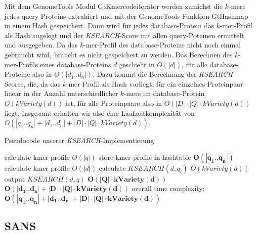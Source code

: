 \documentclass{article}
\begin{document}
Mit dem GenomeTools Modul GtKmercodeiterator werden zunächst die $k$-mere jedes query-Proteins extrahiert und mit der GenomeTools Funktion GtHashmap in einem Hash gespeichert.
Dann wird für jedes database-Protein das $k$-mer-Profil als Hash angelegt und der \emph{KSEARCH}-Score mit allen query-Poteinen ermittelt und ausgegeben. 
Da das $k$-mer-Profil des database-Proteins nicht noch einmal gebraucht wird, braucht es nicht gespeichert zu werden. Das Berechnen des $k$-mer-Profils eines database-Proteins $d$ geschieht in $O(|d|)$, 
für alle database-Proteine also in $O(|d_1..d_n|)$. Dazu kommt die Berechnung der \emph{KSEARCH}-Scores, die, da das $k$-mer Profil als Hash vorliegt, für ein einzelnes Proteinpaar linear in der Anzahl unterschiedlicher $k$-mere im database-Protein $O(kVariety(d))$ ist, für alle Proteinpaare also in $O(|D| \cdot |Q| \cdot kVariety(d))$ liegt. Insgesamt erhalten wir also eine Laufzeitkomplexität von $O(|q_1..q_n|+|d_1..d_n|+|D| \cdot |Q| \cdot kVariety(d))$.



\begin{algorithm}
  \caption{Pseudocode unserer \emph{KSEARCH}-Implementierung}
\begin{algorithmic}
      \State calculate kmer-profile \Comment $O(|q|)$
      \State store kmer-profile in hashtable
    \EndFor \Comment $\mathbf{O(|q_1..q_n|)}$
      \State calculate kmer-profile \Comment $O(|d|)$
        \State calculate $KSEARCH(d,q_{i})$ \Comment $O(kVariety(d))$   
        \State output $KSEARCH(d,q)$
      \EndFor \Comment $\mathbf{O(|Q| \cdot kVariety(d))}$
    \EndFor   \Comment $\mathbf{O(|d_1..d_n|+|D| \cdot |Q| \cdot kVariety(d))}$  
  \EndFunction 
  \Comment overall time complexity: $\mathbf{O(|q_1..q_n|+|d_1..d_n|+|D| \cdot |Q| \cdot kVariety(d))}$
\end{algorithmic}
\end{algorithm}

\subsection{SANS}
\label{sans}
\end{document}
